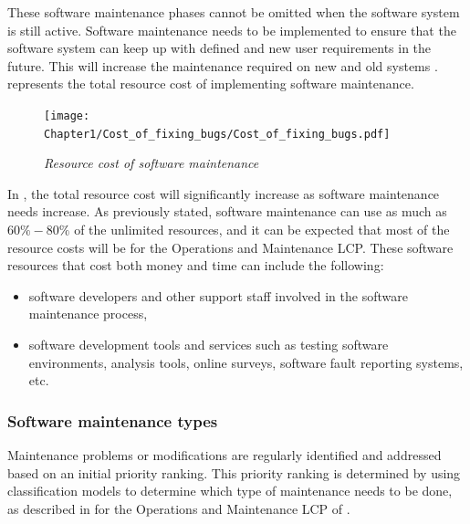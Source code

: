 These software maintenance phases cannot be omitted when the software system is still active. Software maintenance needs to be implemented to ensure that the software system can keep up with defined and new user requirements in the future. This will increase the maintenance required on new and old systems \cite{Niu2018, Galster2019, Hasan2012}.  represents the total resource cost of implementing software maintenance.

\begin{figure}[!htb]
	\centering %
	\texttt{[image: Chapter1/Cost\_of\_fixing\_bugs/Cost\_of\_fixing\_bugs.pdf]}
	\caption[Resource cost of software maintenance]
	{\textit{Resource cost of software maintenance \cite{Ogheneovo2014}}}\label{fig:ch1_costsOfFixingBugs}
\end{figure}

In , the total resource cost will significantly increase as software maintenance needs increase. As previously stated, software maintenance can use as much as $60\%-80\%$ of the unlimited resources, and it can be expected that most of the resource costs will be for the Operations and Maintenance LCP. These software resources that cost both money and time can include the following:

\begin{itemize}
	\item software developers and other support staff involved in the software maintenance process,
	\item software development tools and services such as testing software environments, analysis tools, online surveys, software fault reporting systems, etc.
\end{itemize}

\subsubsection{Software maintenance types}

Maintenance problems or modifications are regularly identified and addressed based on an initial priority ranking. This priority ranking is determined by using classification models to determine which type of maintenance needs to be done, as described in  for the Operations and Maintenance LCP of  \cite{Tang2010, Ping2010}.


